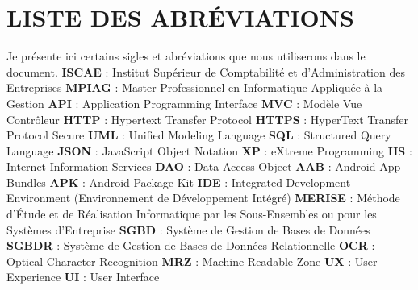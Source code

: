 \documentclass[a4paper, 12pt]{report}
\begin{document}
	\thispagestyle{empty}
	\chapter*{LISTE DES ABRÉVIATIONS} \label{chap:1SIGLES ET ABREVIATIONS}
	Je présente ici certains sigles et abréviations que nous utiliserons dans le document.
	\newline\newline
	\textbf{ISCAE} : Institut Supérieur de Comptabilité et d’Administration des Entreprises \newline
	\textbf{MPIAG} : Master Professionnel en Informatique Appliquée à la Gestion \newline
	\textbf{API} : Application Programming Interface \newline
	\textbf{MVC} : Modèle Vue Contrôleur \newline
	\textbf{HTTP} : Hypertext Transfer Protocol \newline
	\textbf{HTTPS} : HyperText Transfer Protocol Secure \newline
	\textbf{UML} : Unified Modeling Language \newline
	\textbf{SQL} : Structured Query Language \newline
	\textbf{JSON} : JavaScript Object Notation \newline
	\textbf{XP} : eXtreme Programming \newline
	\textbf{IIS} : Internet Information Services \newline
	\textbf{DAO} : Data Access Object \newline
	\textbf{AAB} : Android App Bundles \newline
	\textbf{APK} : Android Package Kit \newline
	\textbf{IDE} : Integrated Development Environment (Environnement de Développement Intégré) \newline
	\textbf{MERISE} : Méthode d’Étude et de Réalisation Informatique par les Sous-Ensembles ou pour les Systèmes d’Entreprise \newline
	\textbf{SGBD} : Système de Gestion de Bases de Données \newline
	\textbf{SGBDR} : Système de Gestion de Bases de Données Relationnelle \newline
	\textbf{OCR} : Optical Character Recognition  \newline
	\textbf{MRZ} : Machine-Readable Zone   \newline
	\textbf{UX} : User Experience
	 \newline  
	\textbf{UI} : User Interface  
	\thispagestyle{empty}
	
\end{document}
